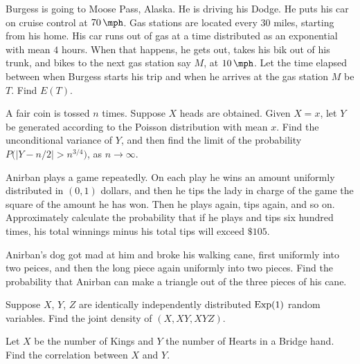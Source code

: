 \begin{problem}
  Burgess is going to Moose Pass, Alaska. He is driving his Dodge. He puts
  his car on cruise control at \(\SI{70}{\mph}\). Gas stations are located
  every \(30\) miles, starting from his home. His car runs out of gas at a
  time distributed as an exponential with mean \(4\) hours. When that
  happens, he gets out, takes his bik out of his trunk, and bikes to the
  next gas station say \(M\), at \(\SI{10}{\mph}\). Let the time elapsed
  between when Burgess starts his trip and when he arrives at the gas
  station \(M\) be \(T\). Find \(E(T)\).
\end{problem}
\begin{solution*}
\end{solution*}

\begin{problem}
  A fair coin is tossed \(n\) times. Suppose \(X\) heads are
  obtained. Given \(X=x\), let \(Y\) be generated according to the Poisson
  distribution with mean \(x\). Find the unconditional variance of \(Y\),
  and then find the limit of the probability
  \(P\bigl(|Y-n/2|>n^{3/4}\bigr)\), as \(n\to\infty\).
\end{problem}
\begin{solution*}
\end{solution*}

\begin{problem}
  Anirban plays a game repeatedly. On each play he wins an amount uniformly
  distributed in \((0,1)\) dollars, and then he tips the lady in charge of the
  game the square of the amount he has won. Then he plays again, tips
  again, and so on. Approximately calculate the probability that if he
  plays and tips six hundred times, his total winnings minus his total tips
  will exceed \(\$105\).
\end{problem}
\begin{solution*}
\end{solution*}

\begin{problem}
  Anirban's dog got mad at him and broke his walking cane, first uniformly
  into two peices, and then the long piece again uniformly into two
  pieces. Find the probability that Anirban can make a triangle out of the
  three pieces of his cane.
\end{problem}
\begin{solution*}
\end{solution*}

\begin{problem}
  Suppose \(X\), \(Y\), \(Z\) are identically independently distributed
  \(\operatorname{Exp}(1)\) random variables. Find the joint density of \((X,XY,XYZ)\).
\end{problem}
\begin{solution*}
\end{solution*}

\begin{problem}
  Let \(X\) be the number of Kings and \(Y\) the number of Hearts in a
  Bridge hand. Find the correlation between \(X\) and \(Y\).
\end{problem}
\begin{solution*}
\end{solution*}


